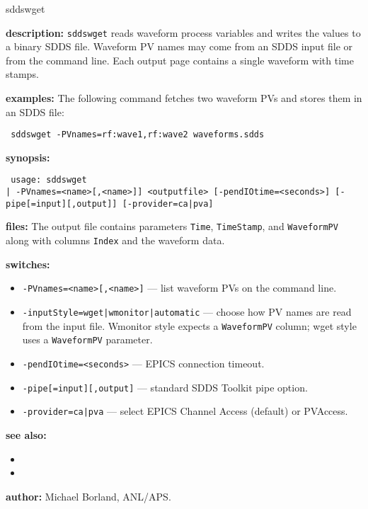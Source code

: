 \begin{sddsprog}{sddswget}
\item \textbf{description:}
  \verb+sddswget+ reads waveform process variables and writes the values to a binary SDDS file.  Waveform PV names may come from an SDDS input file or from the command line.  Each output page contains a single waveform with time stamps.

\item \textbf{examples:}
  The following command fetches two waveform PVs and stores them in an SDDS file:
  \begin{flushleft}{\tt
  sddswget -PVnames=rf:wave1,rf:wave2 waveforms.sdds
  }\end{flushleft}

\item \textbf{synopsis:}
  \begin{flushleft}{\tt
usage: sddswget\\\relax
      [<inputfile> [-inputStyle={wget|wmonitor|automatic}] | -PVnames=<name>[,<name>]]\
      <outputfile> [-pendIOtime=<seconds>] [-pipe[=input][,output]]\
      [-provider={ca|pva}]\
  }\end{flushleft}

\item \textbf{files:}
  The output file contains parameters \verb+Time+, \verb+TimeStamp+, and \verb+WaveformPV+ along with columns \verb+Index+ and the waveform data.

\item \textbf{switches:}
\begin{itemize}
  \item {\tt -PVnames=<name>[,<name>]} --- list waveform PVs on the command line.
  \item {\tt -inputStyle={wget|wmonitor|automatic}} --- choose how PV names are read from the input file.  Wmonitor style expects a \verb+WaveformPV+ column; wget style uses a \verb+WaveformPV+ parameter.
  \item {\tt -pendIOtime=<seconds>} --- EPICS connection timeout.
  \item {\tt -pipe[=input][,output]} --- standard SDDS Toolkit pipe option.
  \item {\tt -provider={ca|pva}} --- select EPICS Channel Access (default) or PVAccess.
\end{itemize}

\item \textbf{see also:}
\begin{itemize}
  \item {}
  \item {}
\end{itemize}

\item \textbf{author:} Michael Borland, ANL/APS.
\end{sddsprog}

